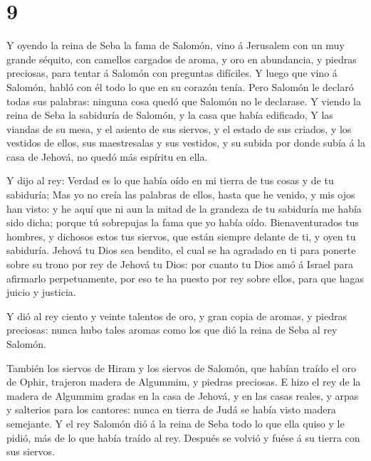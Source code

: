 \hypertarget{section-14-9}{%
\section{9}\label{section-14-9}}

 Y oyendo la reina de Seba la fama de Salomón, vino á
Jerusalem con un muy grande séquito, con camellos cargados de aroma, y
oro en abundancia, y piedras preciosas, para tentar á Salomón con
preguntas difíciles. Y luego que vino á Salomón, habló con él todo lo
que en su corazón tenía.  Pero Salomón le declaró todas
sus palabras: ninguna cosa quedó que Salomón no le declarase.
 Y viendo la reina de Seba la sabiduría de Salomón, y la
casa que había edificado,  Y las viandas de su mesa, y el
asiento de sus siervos, y el estado de sus criados, y los vestidos de
ellos, sus maestresalas y sus vestidos, y su subida por donde subía á la
casa de Jehová, no quedó más espíritu en ella.

 Y dijo al rey: Verdad es lo que había oído en mi tierra
de tus cosas y de tu sabiduría;  Mas yo no creía las
palabras de ellos, hasta que he venido, y mis ojos han visto: y he aquí
que ni aun la mitad de la grandeza de tu sabiduría me había sido dicha;
porque tú sobrepujas la fama que yo había oído. 
Bienaventurados tus hombres, y dichosos estos tus siervos, que están
siempre delante de ti, y oyen tu sabiduría.  Jehová tu
Dios sea bendito, el cual se ha agradado en ti para ponerte sobre su
trono por rey de Jehová tu Dios: por cuanto tu Dios amó á Israel para
afirmarlo perpetuamente, por eso te ha puesto por rey sobre ellos, para
que hagas juicio y justicia.

 Y dió al rey ciento y veinte talentos de oro, y gran
copia de aromas, y piedras preciosas: nunca hubo tales aromas como los
que dió la reina de Seba al rey Salomón.

 También los siervos de Hiram y los siervos de Salomón,
que habían traído el oro de Ophir, trajeron madera de Algummim, y
piedras preciosas.  E hizo el rey de la madera de
Algummim gradas en la casa de Jehová, y en las casas reales, y arpas y
salterios para los cantores: nunca en tierra de Judá se había visto
madera semejante.  Y el rey Salomón dió á la reina de
Seba todo lo que ella quiso y le pidió, más de lo que había traído al
rey. Después se volvió y fuése á su tierra con sus siervos.

